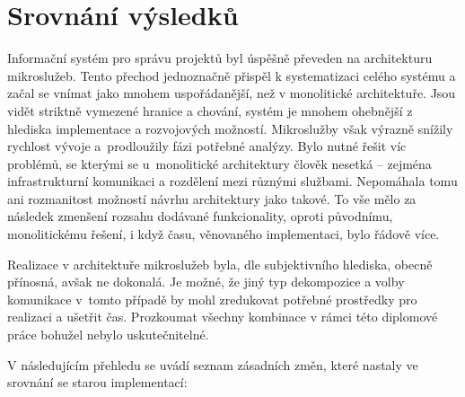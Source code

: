 \chapter{Srovnání výsledků}\label{ch:compare}


Informační systém pro správu projektů byl úspěšně převeden na architekturu mikroslužeb.
Tento přechod jednoznačně přispěl k systematizaci celého systému a začal se vnímat jako mnohem uspořádanější, než v monolitické architektuře.
Jsou vidět striktně vymezené hranice a chování, systém je mnohem ohebnější z hlediska implementace a rozvojových možností.
Mikroslužby však výrazně snížily rychlost vývoje a~prodloužily fázi potřebné analýzy.
Bylo nutné řešit víc problémů, se kterými se u~monolitické architektury člověk nesetká – zejména infrastrukturní komunikaci a rozdělení  mezi různými službami.
Nepomáhala tomu ani rozmanitost možností návrhu architektury jako takové.
To vše mělo za následek zmenšení rozsahu dodávané funkcionality, oproti původnímu, monolitickému řešení, i když času, věnovaného implementaci, bylo řádově více.

Realizace  v architektuře mikroslužeb byla, dle subjektivního hlediska, obecně přínosná, avšak ne dokonalá.
Je možné, že jiný typ dekompozice a volby komunikace v~tomto případě by mohl zredukovat potřebné prostředky pro realizaci a ušetřit čas.
Prozkoumat všechny kombinace v rámci této diplomové práce bohužel nebylo uskutečnitelné.

\newpage

V následujícím přehledu se uvádí seznam zásadních změn, které nastaly ve srovnání se starou implementací:

